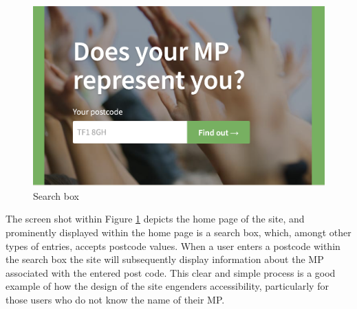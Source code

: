 \begin{figure}
  \centering
  \includegraphics[scale=0.20]{images/they-work-for-you-implementation-search-box}
  \caption{Search box}
  \label{fig:they-work-for-you-implementation-search-box}
\end{figure}

The screen shot within Figure \ref{fig:they-work-for-you-implementation-search-box} depicts the home page of the site,
and prominently displayed within the home page is a search box, which, amongt other types of entries, accepts postcode \cite{postcodes-uk} values.
When a user enters a postcode within the search box the site will subsequently display information about the MP associated with the entered post code.
This clear and simple process is a good example of how the design of the site engenders accessibility,
particularly for those users who do not know the name of their MP.